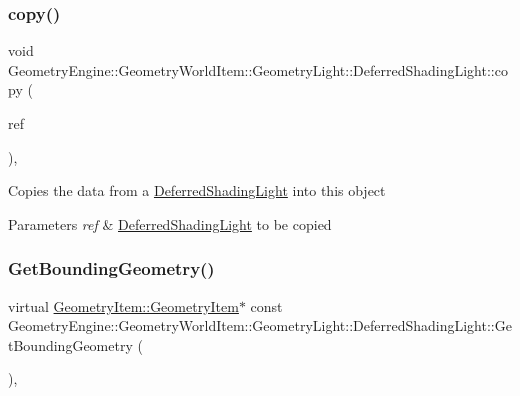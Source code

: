 \subsubsection{\texorpdfstring{copy()}{copy()}}
{\footnotesize\ttfamily void Geometry\+Engine\+::\+Geometry\+World\+Item\+::\+Geometry\+Light\+::\+Deferred\+Shading\+Light\+::copy (\begin{DoxyParamCaption}\item[{const \mbox{\hyperlink{class_geometry_engine_1_1_geometry_world_item_1_1_geometry_light_1_1_deferred_shading_light}{Deferred\+Shading\+Light}} \&}]{ref }\end{DoxyParamCaption})\hspace{0.3cm}{\ttfamily [protected]}, {\ttfamily [virtual]}}

Copies the data from a \mbox{\hyperlink{class_geometry_engine_1_1_geometry_world_item_1_1_geometry_light_1_1_deferred_shading_light}{Deferred\+Shading\+Light}} into this object 
\begin{DoxyParams}{Parameters}
{\em ref} & \mbox{\hyperlink{class_geometry_engine_1_1_geometry_world_item_1_1_geometry_light_1_1_deferred_shading_light}{Deferred\+Shading\+Light}} to be copied \\
\hline
\end{DoxyParams}
\mbox{\label{class_geometry_engine_1_1_geometry_world_item_1_1_geometry_light_1_1_deferred_shading_light_a39a18c54f23b1ebbe87533b5ad02180f}} 
\subsubsection{\texorpdfstring{GetBoundingGeometry()}{GetBoundingGeometry()}}
{\footnotesize\ttfamily virtual \mbox{\hyperlink{class_geometry_engine_1_1_geometry_world_item_1_1_geometry_item_1_1_geometry_item}{Geometry\+Item\+::\+Geometry\+Item}}$\ast$ const Geometry\+Engine\+::\+Geometry\+World\+Item\+::\+Geometry\+Light\+::\+Deferred\+Shading\+Light\+::\+Get\+Bounding\+Geometry (\begin{DoxyParamCaption}{ }\end{DoxyParamCaption})\hspace{0.3cm}{\ttfamily [inline]}, {\ttfamily [virtual]}}

